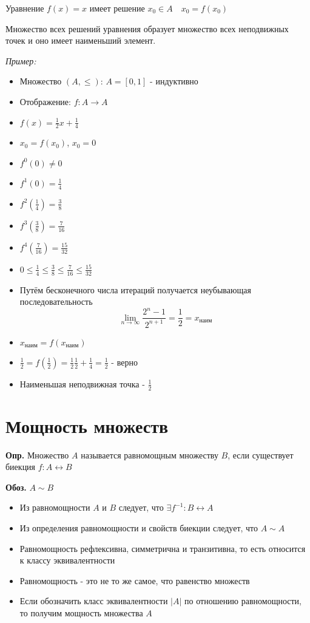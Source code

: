 \documentclass[10pt]{article}
\begin{document}
\par Уравнение $f(x) = x$ имеет решение $x_{0} \in A \quad x_{0} = f(x_{0})$
\par Множество всех решений уравнения образует множество всех неподвижных точек и оно имеет наименьший элемент.
\par\textit{Пример:}
\begin{itemize}
    \item[] Множество $(A, \leq)$: $A = [0, 1]$ - индуктивно
    \item[] Отображение: $f: A \to A$
    \item[] $f(x) = \frac{1}{2}x + \frac{1}{4}$
    \item[] $x_{0} = f(x_{0})$, $x_{0} = 0$
    \item[] $f^0(0) \neq 0$
    \item[] $f^1(0) = \frac{1}{4}$
    \item[] $f^2\left( \frac{1}{4} \right) = \frac{3}{8}$
    \item[] $f^3\left( \frac{3}{8} \right) = \frac{7}{16}$
    \item[] $f^4\left( \frac{7}{16} \right) = \frac{15}{32}$
    \item[] $0 \leq \frac{1}{4} \leq \frac{3}{8} \leq \frac{7}{16} \leq \frac{15}{32}$
    \item[] Путём бесконечного числа итераций получается неубывающая последовательность$$\lim_{ n \to \infty } \frac{2^n - 1}{2^{n+1}} = \frac{1}{2} = x_{наим}$$
    \item[] $x_{наим} = f(x_{наим})$
    \item[] $\frac{1}{2} = f\left( \frac{1}{2} \right) = \frac{1}{2} \frac{1}{2} + \frac{1}{4} = \frac{1}{2}$ - верно
    \item[] Наименьшая неподвижная точка - $\frac{1}{2}$
\end{itemize}

\section*{Мощность множеств}
\par\textbf{Опр.} Множество $A$ называется равномощным множеству $B$, если существует биекция $f: A \leftrightarrow B$
\par\textbf{Обоз.} $A \sim B$
\begin{itemize}
    \item Из равномощности $A$ и $B$ следует, что $\exists f^{-1}: B \leftrightarrow A$
    \item Из определения равномощности и свойств биекции следует, что $A \sim A$
    \item Равномощность рефлексивна, симметрична и транзитивна, то есть относится к классу эквивалентности
    \item Равномощность - это не то же самое, что равенство множеств
    \item Если обозначить класс эквивалентности $|A|$ по отношению равномощности, то получим мощность множества $A$
\end{itemize}
\end{document}
